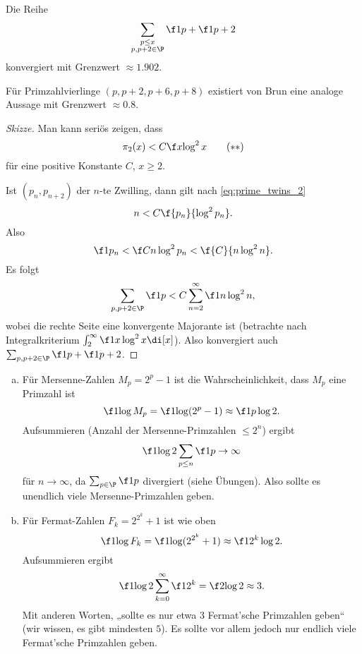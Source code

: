\begin{st}[V. Brun, 1913] \label{7.14}
	Die Reihe
	\[
		\sum_{\substack{p \le x \\ p,p+2 \in \P}} \f 1p + \f 1{p+2}
	\]
	konvergiert mit Grenzwert $\approx 1.902$.
	\begin{note}
		Für Primzahlvierlinge $(p, p+2, p+6, p+8)$ existiert von Brun eine analoge Aussage mit Grenzwert $\approx 0.8$.
	\end{note}
	\begin{proof}[Skizze]
		Man kann seriös zeigen, dass
		\begin{equation} \label{eq:prime_twins_2}
			\pi_2(x) < C \f x{\log^2 x} \tag{$\ast\ast$}
		\end{equation}
		für eine positive Konstante $C$, $x \ge 2$.

		Ist $(p_n, p_{n+2})$ der $n$-te Zwilling, dann gilt nach \eqref{eq:prime_twins_2}
		\[
			n < C \f{p_n}{\log^2 p_n}.
		\]
		Also
		\[
			\f 1{p_n} < \f C{n \log^2 p_n} < \f {C}{n \log^2 n}.
		\]
		Es folgt
		\[
			\sum_{p,p+2 \in \P} \f 1p
			< C \sum_{n=2}^\infty \f 1{n \log^2 n},
		\]
		wobei die rechte Seite eine konvergente Majorante ist (betrachte nach Integralkriterium $\int_2^\infty \f 1{x \log^2 x} \di[x]$).
		Also konvergiert auch $\sum_{p,p+2 \in \P} \f 1p + \f 1{p+2}$.
	\end{proof}
\end{st}

\begin{nt} \label{7.15}
	\begin{enumerate}[a)]
		\item
			Für Mersenne-Zahlen $M_p = 2^p - 1$ ist die Wahrscheinlichkeit, dass $M_p$ eine Primzahl ist
			\[
				\f 1{\log M_p}
				= \f 1{\log (2^p - 1)}
				\approx \f 1{p \log 2}.
			\]
			Aufsummieren (Anzahl der Mersenne-Primzahlen $\le 2^n$) ergibt
			\[
				\f 1{\log 2} \sum_{p \le n} \f 1p \to \infty
			\]
			für $n \to \infty$, da $\sum_{p \in \P} \f 1p$ divergiert (siehe Übungen).
			Also sollte es unendlich viele Mersenne-Primzahlen geben.
		\item
			Für Fermat-Zahlen $F_k = 2^{2^k} + 1$ ist wie oben
			\[
				\f 1{\log F_k}
				= \f 1{\log(2^{2^k} + 1)}
				\approx \f 1{2^k \log 2}.
			\]
			Aufsummieren ergibt
			\[
				\f 1{\log 2} \sum_{k=0}^\infty \f 1{2^k} = \f 2{\log 2} \approx 3.
			\]
			Mit anderen Worten, „sollte es nur etwa $3$ Fermat'sche Primzahlen geben“ (wir wissen, es gibt mindesten $5$).
			Es sollte vor allem jedoch nur endlich viele Fermat'sche Primzahlen geben.
	\end{enumerate}
\end{nt}

